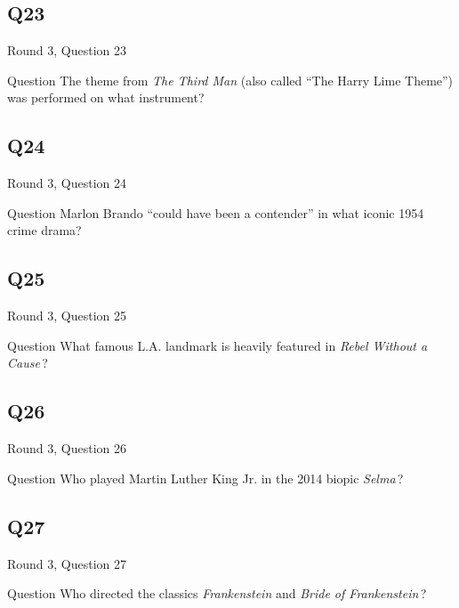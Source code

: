 \documentclass[11pt]{beamer}
\begin{document}
\subsection*{Q23}
\begin{frame}[t]{Round 3, Question 23}
\vspace{2em}
\begin{block}{Question}
The theme from \emph{The Third Man} (also called ``The Harry Lime Theme'') was performed on what instrument?
\end{block}
\end{frame}
    

\subsection*{Q24}
\begin{frame}[t]{Round 3, Question 24}
\vspace{2em}
\begin{block}{Question}
Marlon Brando ``could have been a contender'' in what iconic 1954 crime drama?
\end{block}
\end{frame}
    

\subsection*{Q25}
\begin{frame}[t]{Round 3, Question 25}
\vspace{2em}
\begin{block}{Question}
What famous L.A. landmark is heavily featured in \emph{Rebel Without a Cause}\,?
\end{block}
\end{frame}
    

\subsection*{Q26}
\begin{frame}[t]{Round 3, Question 26}
\vspace{2em}
\begin{block}{Question}
Who played Martin Luther King Jr. in the 2014 biopic \emph{Selma}\,?
\end{block}
\end{frame}
    

\subsection*{Q27}
\begin{frame}[t]{Round 3, Question 27}
\vspace{2em}
\begin{block}{Question}
Who directed the classics \emph{Frankenstein} and \emph{Bride of Frankenstein}\,?
\end{block}
\end{frame}
    
\end{document}
